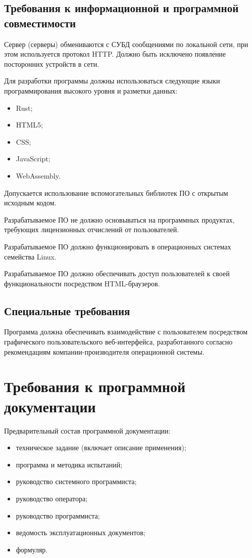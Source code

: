 \documentclass[a4page]{article}
\begin{document}
\subsection{Требования к информационной и программной совместимости}

Сервер (серверы) обмениваются с СУБД сообщениями по локальной сети, при этом используется протокол HTTP. Должно быть исключено появление посторонних устройств в сети.

Для разработки программы должны использоваться следующие языки программирования высокого уровня и разметки данных:

\begin{itemize}
  \item Rust;
  \item HTML5;
  \item CSS;
  \item JavaScript;
  \item WebAssembly.
\end{itemize}

Допускается использование вспомогательных библиотек ПО с открытым исходным кодом.

Разрабатываемое ПО не должно основываться на программных продуктах, требующих лицензионных отчислений от пользователей.

Разрабатываемое ПО должно функционировать в операционных системах семейства Linux.

Разрабатываемое ПО должно обеспечивать доступ пользователей к своей функциональности посредством HTML-браузеров.

\subsection{Специальные требования}

Программа должна обеспечивать взаимодействие с пользователем посредством графического пользовательского веб-интерфейса, разработанного согласно рекомендациям компании-производителя операционной системы.

\section{Требования к программной документации}

Предварительный состав программной документации:

\begin{itemize}
  \item техническое задание (включает описание применения);
  \item программа и методика испытаний;
  \item руководство системного программиста;
  \item руководство оператора;
  \item руководство программиста;
  \item ведомость эксплуатационных документов;
  \item формуляр.
\end{itemize}
\end{document}

